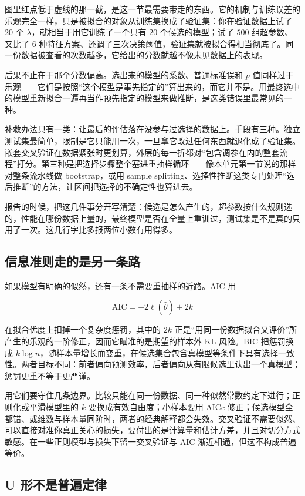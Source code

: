图里红点低于虚线的那一截，是这一节最需要带走的东西。它的机制与训练误差的乐观完全一样，只是被拟合的对象从训练集换成了验证集：你在验证数据上试了 \(20\) 个 \(\lambda\)，就相当于用它训练了一个只有 \(20\) 个候选的模型；试了 \(500\) 组超参数、又比了 \(6\) 种特征方案、还调了三次决策阈值，验证集就被拟合得相当彻底了。同一份数据被查看的次数越多，它给出的分数就越不像未见数据上的表现。

后果不止在于那个分数偏高。选出来的模型的系数、普通标准误和 \(p\) 值同样过于乐观——它们是按照``这个模型是事先指定的''算出来的，而它并不是。用最终选中的模型重新拟合一遍再当作预先指定的模型来做推断，是这类错误里最常见的一种。

补救办法只有一类：让最后的评估落在没参与过选择的数据上。手段有三种。独立测试集最简单，限制是它只能用一次，一旦拿它改过任何东西就退化成了验证集。嵌套交叉验证在数据紧张时更划算，外层的每一折都对``包含调参在内的整套流程''打分。第三种是把选择步骤整个塞进重抽样循环——像本单元第一节说的那样对整条流水线做 bootstrap，或用 sample splitting、选择性推断这类专门处理``选后推断''的方法，让区间把选择的不确定性也算进去。

报告的时候，把这几件事分开写清楚：候选是怎么产生的，超参数按什么规则选的，性能在哪份数据上量的，最终模型是否在全量上重训过，测试集是不是真的只用了一次。这几行字比多报两位小数有用得多。

\subsection{信息准则走的是另一条路}

如果模型有明确的似然，还有一条不需要重抽样的近路。AIC 用

\[
\mathrm{AIC}=-2\ell(\hat\theta)+2k
\]

在拟合优度上扣掉一个复杂度惩罚，其中的 \(2k\) 正是``用同一份数据拟合又评价''所产生的乐观的一阶修正，因而它瞄准的是期望的样本外 KL 风险。BIC 把惩罚换成 \(k\log n\)，随样本量增长而变重，在候选集合包含真模型等条件下具有选择一致性。两者目标不同：前者偏向预测效率，后者偏向从有限候选里认出一个真模型；惩罚更重不等于更严谨。

用它们要守住几条边界。比较只能在同一份数据、同一种似然常数约定下进行；正则化或平滑模型里的 \(k\) 要换成有效自由度；小样本要用 AICc 修正；候选模型全都错、或维数与样本量同阶时，两者的经典解释都会失效。交叉验证不需要似然、可以直接对准你真正关心的损失，要付出的是计算量和估计方差，并且对切分方式敏感。在一些正则模型与损失下留一交叉验证与 AIC 渐近相通，但这不构成普遍等价。

\subsection{U 形不是普遍定律}

